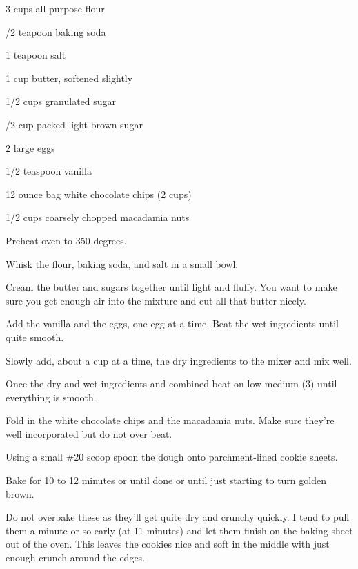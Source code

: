 %
%
%
%
\newpage



\begin{IngredientsAndSteps}
    \ListIngredientsAndSteps
    {
        3 cups all purpose flour

        /2 teapoon baking soda

        1 teapoon salt

        1 cup butter, softened slightly

        1/2 cups granulated sugar

        /2 cup packed light brown sugar

        2 large eggs

        1/2 teaspoon vanilla

        12 ounce bag white chocolate chips (2 cups)

        1/2 cups coarsely chopped macadamia nuts
    }
    {
        Preheat oven to 350 degrees.

        Whisk the flour, baking soda, and salt in a small bowl.

        Cream the butter and sugars together until light and fluffy. You want to make sure you get
        enough air into the mixture and cut all that butter nicely.

        Add the vanilla and the eggs, one egg at a time. Beat the wet ingredients until quite smooth.

        Slowly add, about a cup at a time, the dry ingredients to the mixer and mix well.

        Once the dry and wet ingredients and combined beat on low-medium (3) until
        everything is smooth.

        Fold in the white chocolate chips and the macadamia nuts. Make sure they're well
        incorporated but do not over beat.

        Using a small \#20 scoop spoon the dough onto parchment-lined cookie sheets.

        Bake for 10 to 12 minutes or until done or until just starting to turn golden brown.
    }
\end{IngredientsAndSteps}

\begin{ChefNotes}
    {Do not overbake these as they'll get quite dry and crunchy quickly. I tend to pull
        them a minute or so early (at 11 minutes) and let them finish on the baking sheet out of the oven.
        This leaves the cookies nice and soft in the middle with just enough crunch around the edges.}
\end{ChefNotes}
